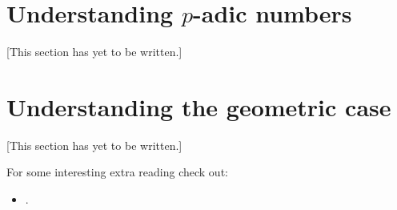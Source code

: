 \documentclass{ximera}
\begin{document}
\section{Understanding $p$-adic numbers}

[This section has yet to be written.]

\section{Understanding the geometric case}

[This section has yet to be written.]

For some interesting extra reading check out:
\begin{itemize}
\item {}. 
\end{itemize}
\end{document}
